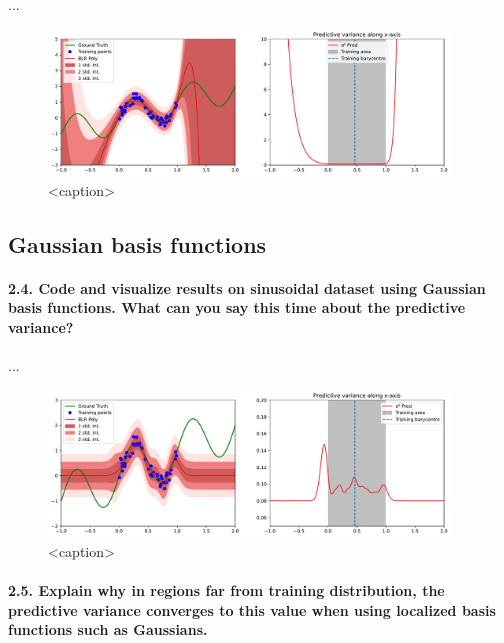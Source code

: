 ...

\begin{figure}[H]
    \centering
    \includegraphics[width=0.95\textwidth]{phi_polynomial.pdf}
    \caption{<caption>}
    \label{fig:phi_polynomial}
\end{figure}

\subsection{Gaussian basis functions}

\paragraph*{2.4. Code and visualize results on sinusoidal dataset using Gaussian basis functions. What can you say this time about the predictive variance?}

...

\begin{figure}[H]
    \centering
    \includegraphics[width=0.95\textwidth]{phi_gaussian.pdf}
    \caption{<caption>}
    \label{fig:phi_gaussian}
\end{figure}

\paragraph*{2.5. Explain why in regions far from training distribution, the predictive variance converges to this value when using localized basis functions such as Gaussians.}


